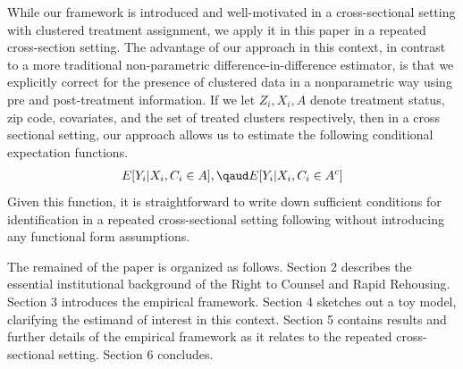 \documentclass[a4paper,12pt]{article}
\begin{document}

While our framework is introduced and well-motivated in a cross-sectional setting with clustered treatment assignment, we apply it in this paper in a repeated cross-section setting. The advantage of our approach in this context, in contrast to a more traditional non-parametric difference-in-difference estimator, is that we explicitly correct for the presence of clustered data in a nonparametric way using pre and post-treatment information. If we let $Z_i, X_i, A$ denote treatment status, zip code, covariates, and the set of treated clusters respectively, then in a cross sectional setting, our approach allows us to estimate the following conditional expectation functions. 
\begin{align*}
    E[Y_i |X_i, C_i \in A], \qaud    E[Y_i |X_i, C_i \in A^c]
\end{align*}
Given this function, it is straightforward to write down sufficient conditions for identification in a repeated cross-sectional setting following \cite{angrist2009mostly} without introducing any functional form assumptions. \par 

The remained of the paper is organized as follows. Section 2 describes the essential institutional background of the Right to Counsel and Rapid Rehousing. Section 3 introduces the empirical framework. Section 4 sketches out a toy model, clarifying the estimand of interest in this context. Section 5 contains results and further details of the empirical framework as it relates to the repeated cross-sectional setting. Section 6 concludes.   










\end{document}

